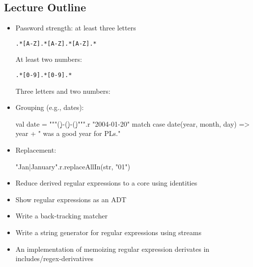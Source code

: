 \newlecture

\begin{instructor}

\section*{Lecture Outline}

\begin{itemize}

\item Password strength: at least three letters

\begin{verbatim}
.*[A-Z].*[A-Z].*[A-Z].*
\end{verbatim}

At least two numbers:

\begin{verbatim}
.*[0-9].*[0-9].*
\end{verbatim}

Three letters and two numbers:

\item Grouping (e.g., dates):

\begin{scalacode}
    val date = """(\d\d\d\d)-(\d\d)-(\d\d)""".r
    "2004-01-20" match {
      case date(year, month, day) => year + " was a good year for PLs."
    }
\end{scalacode}

\item Replacement:

\begin{scalacode}
"Jan|January".r.replaceAllIn(str, "01")
\end{scalacode}

\item Reduce derived regular expressions to a core using identities

\item Show regular expressions as an ADT

\item Write a back-tracking matcher

\item Write a string generator for regular expressions using streams

\item An implementation of memoizing regular expression derivates in includes/regex-derivatives

\end{itemize}

\end{instructor}